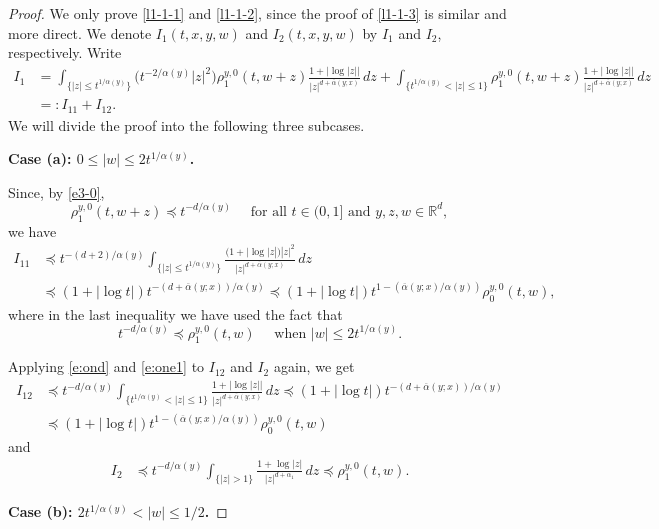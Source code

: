 \documentclass[a4paper,11pt]{amsart}
\renewcommand{\le}{\leqslant}
\newcommand{\R}{\mathds R}
\newcommand{\p}{\preceq}
\newcommand{\A}{\alpha}
\theoremstyle{definition}
\begin{document}
\begin{proof}
We only prove \eqref{l1-1-1} and \eqref{l1-1-2}, since
the proof of \eqref{l1-1-3} is similar and more direct. We denote $I_1(t,x,y,w)$ and $I_2(t,x,y,w)$ by $I_1$ and $I_2$, respectively.
Write
\begin{align*}
I_1&=\int_{\{|z|\le t^{{1/\A(y)}}\}}
\big(t^{-{2}/{\A(y)}}|z|^2\big)\rho^{y,0}_1(t,w{+} z)\frac{1+|\log|z||}{|z|^{d+\overline{\A}(y;x)}}\,dz  +\int_{\{t^{{1/\A(y)}}<|z|\le 1\}}\rho^{y,0}_1(t,w{+} z)\frac{1+|\log|z||}{|z|^{d+\overline{\A}(y;x)}}\,dz\\
&=:I_{11}+I_{12}.
\end{align*}
We will divide the proof into the following three subcases.



{\bf Case (a): $0\le |w| \le 2t^{{1/\A(y)}}$.}



Since, by \eqref{e3-0}, \begin{equation}\label{e:ond} \rho^{y,0}_1(t,w{+} z)\p t^{-{d/\A(y)}}\quad \textrm{ for all } t\in(0,1]\textrm{ and }  y,z,w\in\R^d,\end{equation} we have
\begin{align*}
I_{11}&\p t^{-{(d+2)}/{\A(y)}}\int_{\{|z|\le t^{{1/\A(y)}}\}}
\frac{(1+|\log|z|)|z|^2}{|z|^{d+\overline{\A}(y;x)}}\,dz\\
&\p(1+|\log t|)t^{-{(d+\overline\A(y;x))}/{\A(y)}} \p(1+|\log t|)t^{1-({\overline{\A}(y;x)}/{\A(y)})}\rho^{y,0}_0(t,w),
\end{align*}
where in the last inequality we have used the fact that \begin{equation}\label{e:one1}t^{-{d/\A(y)}}\p \rho^{y,0}_1(t,w)
\quad \textrm{ when } |w|\le 2t^{{1/\A(y)}}.\end{equation}

Applying \eqref{e:ond} and \eqref{e:one1} to
$I_{12}$ and $I_2$ again, we get
\begin{align*}
I_{12}&\p t^{-{d/\A(y)}}\int_{\{t^{{1/\A(y)}}<|z|\le 1\}}
\frac{1+|\log |z||}{|z|^{d+\overline{\A}(y;x)}}\,dz \p(1+|\log t|)t^{-({d+\overline\A(y;x)})/{\A(y)}}\\
& \p(1+|\log t|)t^{1-({\overline
\A(y;x)}/{\A(y)})}\rho^{y,0}_0(t,w)
\end{align*} and
\begin{align*}
I_2&\p  t^{-{d/\A(y)}}\int_{\{|z|> 1\}} \frac{1+\log
|z|}{|z|^{d+\A_1}}\,dz\p \rho^{y,0}_1(t,w).
\end{align*}


{\bf Case (b): $2t^{{1/\A(y)}}<|w|\le {1}/{2}$.}


\end{proof}
\end{document}
